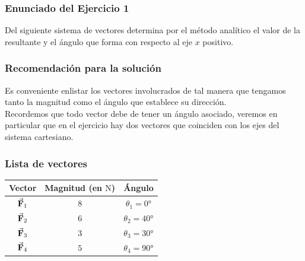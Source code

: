 \documentclass[12pt]{beamer}
\begin{document}
\begin{frame}
\frametitle{Enunciado del Ejercicio 1}
Del siguiente sistema de vectores determina por el método analítico el valor de la resultante y el ángulo que forma con respecto al eje $x$ positivo.
\end{frame}
\begin{frame}[plain]
\begin{figure}
\centering
{}
\end{figure}
\end{frame}
\begin{frame}
\frametitle{Recomendación para la solución}
Es conveniente enlistar los vectores involucrados de tal manera que tengamos tanto la magnitud como el ángulo que establece su dirección.
\\
\bigskip
\pause
Recordemos que todo vector debe de tener un ángulo asociado, veremos en particular que en el ejercicio hay dos vectores que coinciden con los ejes del sistema cartesiano.
\end{frame}
\begin{frame}
\frametitle{Lista de vectores}
\begin{table}
\centering
\begin{tabular}{c | c | c }
Vector & Magnitud (en $\unit{\newton}$) & Ángulo \\ \hline
$\va{F}_{1}$ & $8$ & $\theta_{1} = \ang{0}$ \\ \hline
$\va{F}_{2}$ & $6$ & $\theta_{2} = \ang{40}$ \\ \hline
$\va{F}_{3}$ & $3$ & $\theta_{3} = \ang{30}$ \\ \hline
$\va{F}_{4}$ & $5$ & $\theta_{4} = \ang{90}$ \\ \hline
\end{tabular}
\end{table}
\end{frame}
\end{document}
